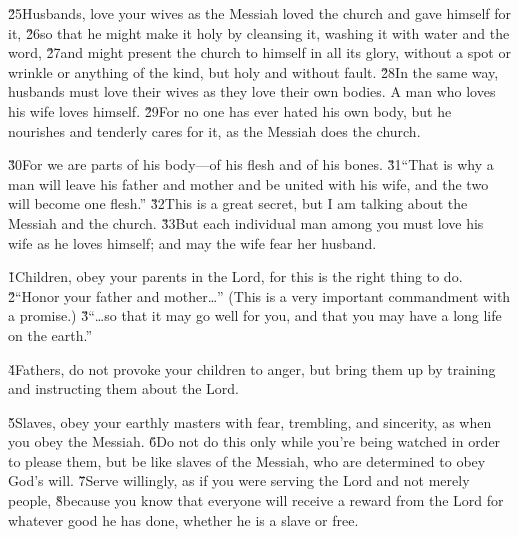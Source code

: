\v{25}Husbands, love your wives as the Messiah loved the church and gave himself for it, \v{26}so that he might make it holy by cleansing it, washing it with water and the word, \v{27}and might present the church to himself in all its glory, without a spot or wrinkle or anything of the kind, but holy and without fault. \v{28}In the same way, husbands must love their wives as they love their own bodies. A man who loves his wife loves himself. \v{29}For no one has ever hated his own body, but he nourishes and tenderly cares for it, as the Messiah does the church.

\v{30}For we are parts of his body---of his flesh and of his bones. \v{31}``That is why a man will leave his father and mother and be united with his wife, and the two will become one flesh.'' \v{32}This is a great secret, but I am talking about the Messiah and the church. \v{33}But each individual man among you must love his wife as he loves himself; and may the wife fear her husband.

\v{1}Children, obey your parents in the Lord, for this is the right thing to do. \v{2}``Honor your father and mother{\ldots}'' (This is a very important commandment with a promise.) \v{3}``{\ldots}so that it may go well for you, and that you may have a long life on the earth.''

\v{4}Fathers, do not provoke your children to anger, but bring them up by training and instructing them about the Lord.

\v{5}Slaves, obey your earthly masters with fear, trembling, and sincerity, as when you obey the Messiah. \v{6}Do not do this only while you're being watched in order to please them, but be like slaves of the Messiah, who are determined to obey God's will. \v{7}Serve willingly, as if you were serving the Lord and not merely people, \v{8}because you know that everyone will receive a reward from the Lord for whatever good he has done, whether he is a slave or free.

